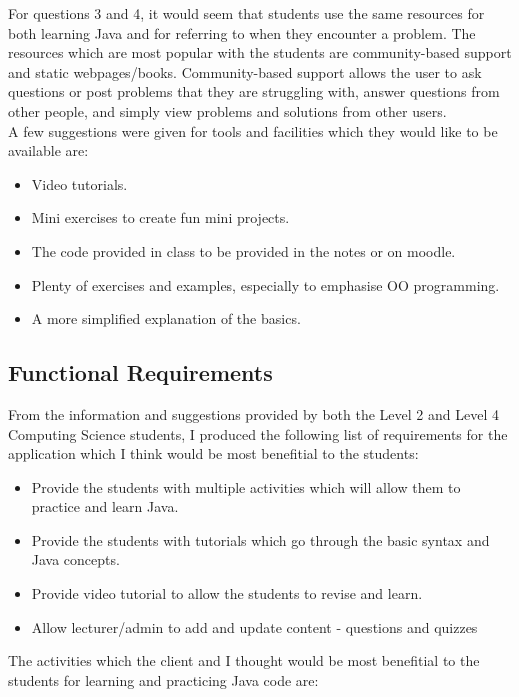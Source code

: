 \documentclass{article}
\begin{document}
For questions 3 and 4, it would seem that students use the same resources for both learning Java and for referring to when they encounter a problem. The resources which are most popular with the students are community-based support and static webpages/books. Community-based support allows the user to ask questions or post problems that they are struggling with, answer questions from other people, and simply view problems and solutions from other users.\\

A few suggestions were given for tools and facilities which they would like to be available are:

\begin{itemize}
\item Video tutorials.
\item Mini exercises to create fun mini projects.
\item The code provided in class to be provided in the notes or on moodle.
\item Plenty of exercises and examples, especially to emphasise OO programming.
\item A more simplified explanation of the basics.
\end{itemize}

\subsection{Functional Requirements}

From the information and suggestions provided by both the Level 2 and Level 4 Computing Science students, I produced the following list of requirements for the application which I think would be most benefitial to the students:

\begin{itemize}
\item Provide the students with multiple activities which will allow them to practice and learn Java.
\item Provide the students with tutorials which go through the basic syntax and Java concepts.
\item Provide video tutorial to allow the students to revise and learn.
\item Allow lecturer/admin to add and update content - questions and quizzes
\end{itemize}

The activities which the client and I thought would be most benefitial to the students for learning and practicing Java code are:\\
\end{document}
